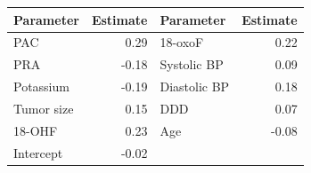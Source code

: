 \begin{tabular}{lr@{\qquad}lr}
\toprule
Parameter & Estimate & Parameter & Estimate \\
\midrule
PAC & 0.29 & 18-oxoF & 0.22 \\
PRA & -0.18 & Systolic BP & 0.09 \\
Potassium & -0.19 & Diastolic BP & 0.18 \\
Tumor size & 0.15 & DDD & 0.07 \\
18-OHF & 0.23 & Age & -0.08 \\
Intercept & -0.02 & & \\
\bottomrule
\end{tabular}

